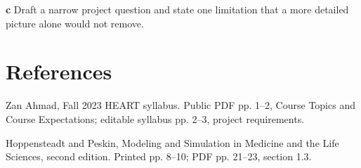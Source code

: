 \documentclass[11pt,letterpaper]{article}
\theoremstyle{definition}\newtheorem{definition}{Definition}\newtheorem{example}{Example}
\numberwithin{equation}{section}
\begin{document}
\textbf{c} Draft a narrow project question and state one limitation that a more detailed picture alone would not remove.

\section*{References}
\noindent\begin{minipage}{\linewidth}
Zan Ahmad, Fall 2023 HEART syllabus. Public PDF pp. 1--2, Course Topics and Course Expectations; editable syllabus pp. 2--3, project requirements.

\end{minipage}\par\medskip
\noindent\begin{minipage}{\linewidth}
Hoppensteadt and Peskin, Modeling and Simulation in Medicine and the Life Sciences, second edition. Printed pp. 8--10; PDF pp. 21--23, section 1.3.

\end{minipage}\par\medskip
\end{document}
